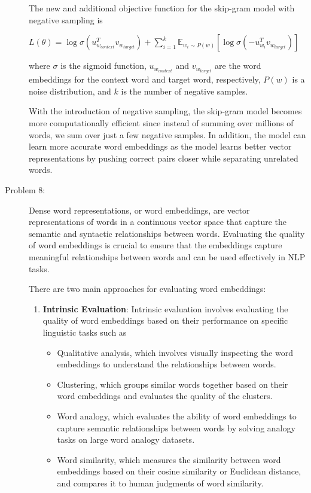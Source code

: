 \documentclass[12pt]{article}
\begin{document}
\begin{description}
  The new and additional objective function for the skip-gram model with negative sampling is

  \begin{center}
    $\displaystyle{L(\theta) = \log \sigma(u_{w_{context}}^T v_{w_{target}}) + \sum_{i=1}^{k}{\mathbb{E}_{w_i \sim P(w)} [\log \sigma(-u_{w_{i}}^T v_{w_{target}})]}}$
  \end{center}

  where $\sigma$ is the sigmoid function, $u_{w_{context}}$ and $v_{w_{target}}$ are the word embeddings for the context word and target word, respectively, $P(w)$ is a noise 
  distribution, and $k$ is the number of negative samples.

  With the introduction of negative sampling, the skip-gram model becomes more computationally efficient since instead of summing over millions of words, 
  we sum over just a few negative samples. In addition, the model can learn more accurate word embeddings as the model learns better vector representations by pushing correct 
  pairs closer while separating unrelated words.

  \pagebreak

  \item[Problem 8:] \hfill %
  
  Dense word representations, or word embeddings, are vector representations of words in a continuous vector space that capture the semantic and syntactic relationships between 
  words.
  Evaluating the quality of word embeddings is crucial to ensure that the embeddings capture meaningful relationships between words and can be used effectively in NLP tasks.

  There are two main approaches for evaluating word embeddings:

  \begin{enumerate}
    \item \textbf{Intrinsic Evaluation}: Intrinsic evaluation involves evaluating the quality of word embeddings based on their performance on specific linguistic tasks such as
    
    \begin{itemize}
      \item Qualitative analysis, which involves visually inspecting the word embeddings to understand the relationships between words.
      \item Clustering, which groups similar words together based on their word embeddings and evaluates the quality of the clusters.
      \item Word analogy, which evaluates the ability of word embeddings to capture semantic relationships between words by solving analogy tasks on large word analogy datasets.
      \item Word similarity, which measures the similarity between word embeddings based on their cosine similarity or Euclidean distance, and compares it to human judgments of word similarity.
    \end{itemize}


\end{enumerate}
\end{description}
\end{document}
